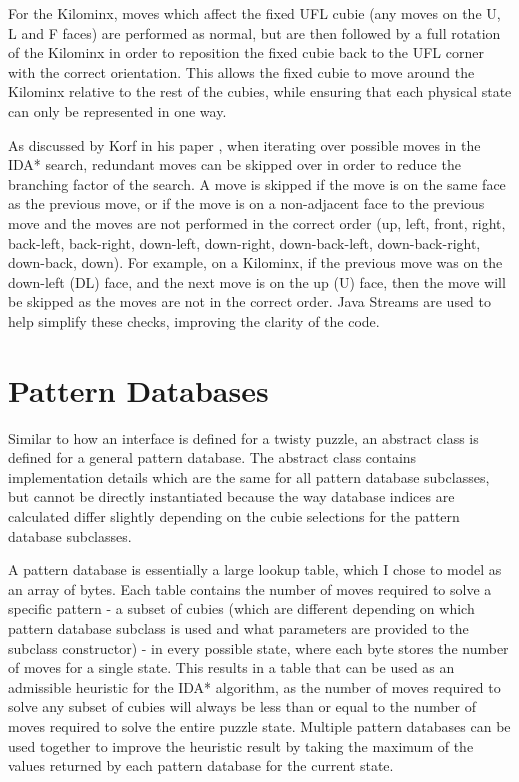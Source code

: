 For the Kilominx, moves which affect the fixed UFL cubie (any moves on the U, L and F faces) are performed as normal, but are then followed by a full rotation of the Kilominx in order to reposition the fixed cubie back to the UFL corner with the correct orientation. This allows the fixed cubie to move around the Kilominx relative to the rest of the cubies, while ensuring that each physical state can only be represented in one way.

As discussed by Korf in his paper \cite{korf}, when iterating over possible moves in the IDA* search, redundant moves can be skipped over in order to reduce the branching factor of the search. A move is skipped if the move is on the same face as the previous move, or if the move is on a non-adjacent face to the previous move and the moves are not performed in the correct order (up, left, front, right, back-left, back-right, down-left, down-right, down-back-left, down-back-right, down-back, down). For example, on a Kilominx, if the previous move was on the down-left (DL) face, and the next move is on the up (U) face, then the move will be skipped as the moves are not in the correct order. Java Streams are used to help simplify these checks, improving the clarity of the code.

\section{Pattern Databases}
Similar to how an interface is defined for a twisty puzzle, an abstract class is defined for a general pattern database. The abstract class contains implementation details which are the same for all pattern database subclasses, but cannot be directly instantiated because the way database indices are calculated differ slightly depending on the cubie selections for the pattern database subclasses.

A pattern database is essentially a large lookup table, which I chose to model as an array of bytes. Each table contains the number of moves required to solve a specific pattern - a subset of cubies (which are different depending on which pattern database subclass is used and what parameters are provided to the subclass constructor) - in every possible state, where each byte stores the number of moves for a single state. This results in a table that can be used as an admissible heuristic for the IDA* algorithm, as the number of moves required to solve any subset of cubies will always be less than or equal to the number of moves required to solve the entire puzzle state. Multiple pattern databases can be used together to improve the heuristic result by taking the maximum of the values returned by each pattern database for the current state.

